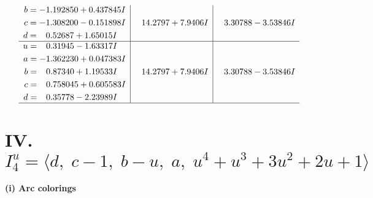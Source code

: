 \documentclass[1p]{elsarticle_modified}
\theoremstyle{definition}
\begin{document}
$$\begin{array}{c|c|c}
\begin{aligned}
b &= -1.192850 + 0.437845 I \\
c &= -1.308200 - 0.151898 I \\
d &= \phantom{-}0.52687 + 1.65015 I\end{aligned}
 & \phantom{-}14.2797 + 7.9406 I & \phantom{-}3.30788 - 3.53846 I \\ \hline\begin{aligned}
u &= \phantom{-}0.31945 - 1.63317 I \\
a &= -1.362230 + 0.047383 I \\
b &= \phantom{-}0.87340 + 1.19533 I \\
c &= \phantom{-}0.758045 + 0.605583 I \\
d &= \phantom{-}0.35778 - 2.23989 I\end{aligned}
 & \phantom{-}14.2797 + 7.9406 I & \phantom{-}3.30788 - 3.53846 I\\
 \hline 
 \end{array}$$\newpage\newpage\renewcommand{\arraystretch}{1}
\centering \section*{IV. $I^u_{4}= \langle d,\;c-1,\;b- u,\;a,\;u^4+u^3+3 u^2+2 u+1 \rangle$}
\flushleft \textbf{(i) Arc colorings}\\
\end{document}
